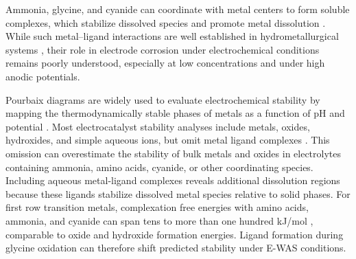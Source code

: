 \documentclass[twoside,twocolumn,9pt]{article}
\begin{document}
Ammonia, glycine, and cyanide can coordinate with metal centers to form soluble complexes, which stabilize dissolved species and promote metal dissolution \cite{Meng1996PrinciplesReview,Wang2022AmmoniaSystem,Ma2021ALeaching,Li2025Glycine-mediatedStudy}. While such metal–ligand interactions are well established in hydrometallurgical systems \cite{Akcil2015PreciousReview,Azadi2021SustainableGlycine,Oraby2020GoldPermanganate,Sarvar2023ApplicationStructure,OConnor2018ElectrochemicalSolutions}, their role in electrode corrosion under electrochemical conditions remains poorly understood, especially at low concentrations and under high anodic potentials.

Pourbaix diagrams are widely used to evaluate electrochemical stability by mapping the thermodynamically stable phases of metals as a function of pH and potential \cite{Pourbaix1974AtlasSolutions,Huang2015ElectrochemicalCalculations,wang2024optimal}. Most electrocatalyst stability analyses include metals, oxides, hydroxides, and simple aqueous ions, but omit metal ligand complexes \cite{Persson2012PredictionStates,Patel2019EfficientCompounds}. This omission can overestimate the stability of bulk metals and oxides in electrolytes containing ammonia, amino acids, cyanide, or other coordinating species. Including aqueous metal-ligand complexes reveals additional dissolution regions because these ligands stabilize dissolved metal species relative to solid phases. For first row transition metals, complexation free energies with amino acids, ammonia, and cyanide can span tens to more than one hundred kJ/mol \cite{molecules27082407,Smith1989CriticalConstants,Harrington2005DeterminationIon,Bjerrum1957StabilitySubstances}, comparable to oxide and hydroxide formation energies. Ligand formation during glycine oxidation can therefore shift predicted stability under E-WAS conditions.
\end{document}

